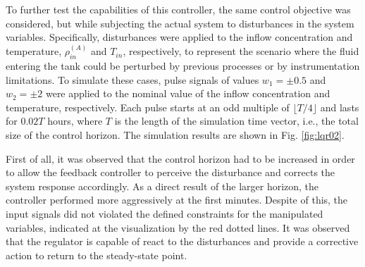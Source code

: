 \documentclass[a4paper,11pt]{book}
\numberwithin{figure}{chapter}
\numberwithin{equation}{chapter}
\numberwithin{table}{chapter}
\theoremstyle{definition}
\begin{document}
To further test the capabilities of this controller, the same control objective was considered, but while subjecting the actual system to disturbances in the system variables. Specifically, disturbances were applied to the inflow concentration and temperature, $\rho^{(A)}_{in}$ and $T_{in}$, respectively, to represent the scenario where the fluid entering the tank could be perturbed by previous processes or by instrumentation limitations. To simulate these cases, pulse signals of values $w_1 = \pm 0.5$ and $w_2 = \pm 2$ were applied to the nominal value of the inflow concentration and temperature, respectively. Each pulse starts at an odd multiple of $\lfloor T/4 \rfloor$ and lasts for $0.02T$ hours, where $T$ is the length of the simulation time vector, i.e., the total size of the control horizon. The simulation results are shown in Fig. \ref{fig:lqr02}.

First of all, it was observed that the control horizon had to be increased in order to allow the feedback controller to perceive the disturbance and corrects the system response accordingly. As a direct result of the larger horizon, the controller performed more aggressively at the first minutes. Despite of this, the input signals did not violated the defined constraints for the manipulated variables, indicated at the visualization by the red dotted lines. It was observed that the regulator is capable of react to the disturbances and provide a corrective action to return to the steady-state point. 
\end{document}

